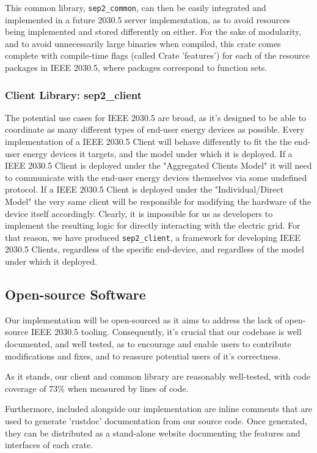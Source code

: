 This common library, \texttt{sep2\_common}, can then be easily integrated and implemented in a future 2030.5 server implementation, as to avoid resources being implemented and stored differently on either. 
For the sake of modularity, and to avoid unnecessarily large binaries when compiled, this crate comes complete with compile-time flags (called Crate 'features') for each of the resource packages in IEEE 2030.5, where packages correspond to function sets.

\subsubsection{Client Library: \- sep2\_client}
The potential use cases for IEEE 2030.5 are broad, as it's designed to be able to coordinate as many different types of end-user energy devices as possible.
Every implementation of a IEEE 2030.5 Client will behave differently to fit the the end-user energy devices it targets, and the model under which it is deployed. 
If a IEEE 2030.5 Client is deployed under the "Aggregated Clients Model" it will need to communicate with the end-user energy devices themselves via some undefined protocol.
If a IEEE 2030.5 Client is deployed under the "Individual/Direct Model" the very same client will be responsible for modifying the hardware of the device itself accordingly. 
Clearly, it is impossible for us as developers to implement the resulting logic for directly interacting with the electric grid.
For that reason, we have produced \texttt{sep2\_client}, a framework for developing IEEE 2030.5 Clients, regardless of the specific end-device, and regardless of the model under which it deployed.

\subsection{Open-source Software}
Our implementation will be open-sourced as it aims to address the lack of open-source IEEE 2030.5 tooling. Consequently, it's crucial that our codebase is well documented, and well tested, as to encourage and enable users to contribute modifications and fixes, and to reassure potential users of it's correctness.

As it stands, our client and common library are reasonably well-tested, with code coverage of 73\% when measured by lines of code.

Furthermore, included alongside our implementation are inline comments that are used to generate 'rustdoc' documentation from our source code. Once generated, they can be distributed as a stand-alone website documenting the features and interfaces of each crate.

